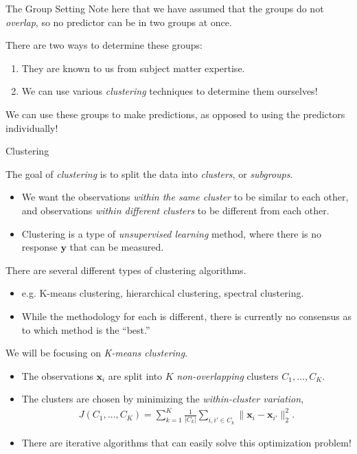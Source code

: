 \documentclass[8pt]{beamer}
\newcommand{\mydef}[1]{\textcolor{SteelBlue3}{\textit{#1}}} %
\begin{document}
\begin{frame}{The Group Setting}
Note here that we have assumed that the groups do not \mydef{overlap}, so no predictor can be in two groups at once. %

There are two ways to determine these groups: %
\begin{enumerate}
    \item They are known to us from subject matter expertise. %
    \item We can use various \mydef{clustering} techniques to determine them ourselves! %
\end{enumerate}

We can use these groups to make predictions, as opposed to using the predictors individually!

\end{frame}

\begin{frame}{Clustering}

The goal of \mydef{clustering} is to split the data into \mydef{clusters}, or \mydef{subgroups}. %
\begin{itemize}
    \item We want the observations \textit{within the same cluster} to be similar to each other, and observations \textit{within different clusters} to be different from each other. %
    \item Clustering is a type of \mydef{unsupervised learning} method, where there is no response $\mathbf{y}$ that can be measured. %
\end{itemize}

There are several different types of clustering algorithms. %
\begin{itemize}
    \item e.g. K-means clustering, hierarchical clustering, spectral clustering. %
    \item While the methodology for each is different, there is currently no consensus as to which method is the ``best.'' %
\end{itemize}

We will be focusing on \mydef{K-means clustering}. %
\begin{itemize}
    \item The observations $\bm{x}_i$ are split into $K$ \textit{non-overlapping} clusters $C_1, \ldots, C_K$. %
    \item The clusters are chosen by minimizing the \mydef{within-cluster variation}, 
    \begin{align*}
        J(C_1, \ldots, C_K) = \sum_{k=1}^K \frac{1}{|C_k|} \sum_{i,i' \in C_k} \| \bm{x}_{i} - \bm{x}_{i'} \|_2^2.
    \end{align*} %
    \item There are iterative algorithms that can easily solve this optimization problem!
\end{itemize}


\end{frame}
\end{document}
